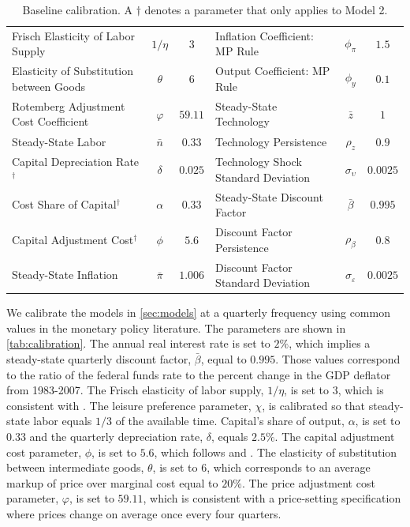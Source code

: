 \documentclass[12pt,final]{article}
\begin{document}
\begin{table}[t]\scriptsize
  \begin{tabular*}{\textwidth}{l@{\extracolsep{\fill}}cclcc}
    \toprule
    Frisch Elasticity of Labor Supply       &$1/\eta$   & $3$    & Inflation Coefficient: MP Rule            &$\phi_\pi$    &$1.5$   \\
    Elasticity of Substitution between Goods&$\theta$   & $6$    & Output Coefficient: MP Rule               &$\phi_y$      &$0.1$   \\
    Rotemberg Adjustment Cost Coefficient   &$\varphi$  & $59.11$& Steady-State Technology                   &$\bar{z}$     &$1$     \\
    Steady-State Labor                      &$\bar{n}$  & $0.33$ & Technology Persistence                    &$\rho_z$      &$0.9$   \\
    Capital Depreciation Rate$^\dag$        &$\delta$   & $0.025$& Technology Shock Standard Deviation       &$\sigma_\upsilon$&$0.0025$\\
    Cost Share of Capital$^\dag$            &$\alpha$   & $0.33$ & Steady-State Discount Factor              &$\bar{\beta}$ &$0.995$ \\
    Capital Adjustment Cost$^\dag$          &$\phi$     & $5.6$  & Discount Factor Persistence               &$\rho_\beta$  &$0.8$   \\
    Steady-State Inflation                  &$\bar{\pi}$& $1.006$& Discount Factor Standard Deviation        &$\sigma_\varepsilon$&$0.0025$\\
    \bottomrule
  \end{tabular*}
  \caption{Baseline calibration. A $\dag$ denotes a parameter that only applies to Model 2.}
  \label{tab:calibration}
\end{table}\normalsize

We calibrate the models in \autoref{sec:models} at a quarterly frequency using common values in the monetary policy literature. The parameters are shown in \autoref{tab:calibration}. The annual real interest rate is set to $2\%$, which implies a steady-state quarterly discount factor, $\bar{\beta}$, equal to $0.995$. Those values correspond to the ratio of the federal funds rate to the percent change in the GDP deflator from 1983-2007. The Frisch elasticity of labor supply, $1/\eta$, is set to $3$, which is consistent with \citet{Peterman2012}. The leisure preference parameter, $\chi$, is calibrated so that steady-state labor equals $1/3$ of the available time. Capital's share of output, $\alpha$, is set to $0.33$ and the quarterly depreciation rate, $\delta$, equals $2.5\%$. The capital adjustment cost parameter, $\phi$, is set to $5.6$, which follows \citet{Eberly1997} and \citet{ErcegLevin2003}. The elasticity of substitution between intermediate goods, $\theta$, is set to $6$, which corresponds to an average markup of price over marginal cost equal to $20\%$. The price adjustment cost parameter, $\varphi$, is set to $59.11$, which is consistent with a \citet{Calvo1983} price-setting specification where prices change on average once every four quarters.
\end{document}
